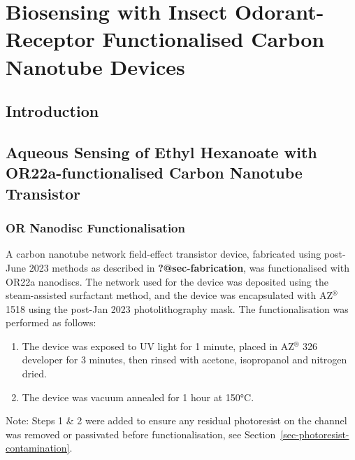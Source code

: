 \documentclass[
  a4paper,
]{scrbook}
\begin{document}
\hypertarget{biosensing-with-insect-odorant-receptor-functionalised-carbon-nanotube-devices}{%
\chapter{Biosensing with Insect Odorant-Receptor Functionalised Carbon
Nanotube
Devices}\label{biosensing-with-insect-odorant-receptor-functionalised-carbon-nanotube-devices}}

\hypertarget{introduction-2}{%
\section{Introduction}\label{introduction-2}}

\hypertarget{sec-aqueous-sensing-EtHex}{%
\section{Aqueous Sensing of Ethyl Hexanoate with OR22a-functionalised
Carbon Nanotube Transistor}\label{sec-aqueous-sensing-EtHex}}

\hypertarget{or-nanodisc-functionalisation}{%
\subsection{OR Nanodisc
Functionalisation}\label{or-nanodisc-functionalisation}}

A carbon nanotube network field-effect transistor device, fabricated
using post-June 2023 methods as described in \textbf{?@sec-fabrication},
was functionalised with OR22a nanodiscs. The network used for the device
was deposited using the steam-assisted surfactant method, and the device
was encapsulated with AZ\(^\circledR\) 1518 using the post-Jan 2023
photolithography mask. The functionalisation was performed as follows:

\begin{enumerate}
\def\labelenumi{\arabic{enumi}.}
\item
  The device was exposed to UV light for 1 minute, placed in
  AZ\(^\circledR\) 326 developer for 3 minutes, then rinsed with
  acetone, isopropanol and nitrogen dried.
\item
  The device was vacuum annealed for 1 hour at 150°C.
\end{enumerate}

Note: Steps 1 \& 2 were added to ensure any residual photoresist on the
channel was removed or passivated before functionalisation, see
Section~\ref{sec-photoresist-contamination}.
\end{document}
